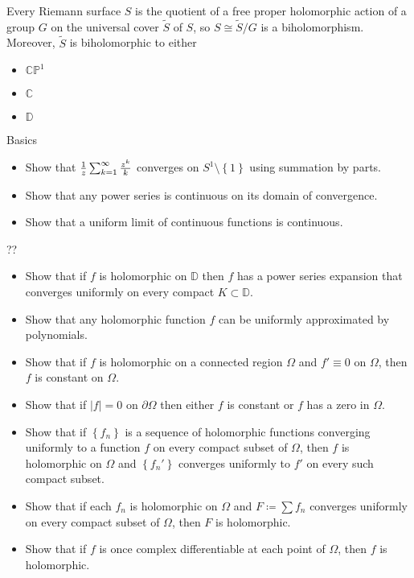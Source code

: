 \begin{theorem}[Uniformization]

Every Riemann surface \(S\) is the quotient of a free proper holomorphic
action of a group \(G\) on the universal cover \(\tilde S\) of \(S\), so
\(S\cong \tilde S/G\) is a biholomorphism. Moreover, \(\tilde S\) is
biholomorphic to either

\begin{itemize}
\tightlist
\item
  \({\mathbb{CP}}^1\)
\item
  \({\mathbb{C}}\)
\item
  \({\mathbb{D}}\)
\end{itemize}

\end{theorem}

Basics

\begin{itemize}
\tightlist
\item
  Show that \({1\over z} \sum_{k=1}^\infty {z^k \over k}\) converges on
  \(S^1 \setminus\left\{{1}\right\}\) using summation by parts.
\item
  Show that any power series is continuous on its domain of convergence.
\item
  Show that a uniform limit of continuous functions is continuous.
\end{itemize}

??

\begin{itemize}
\item
  Show that if \(f\) is holomorphic on \({\mathbb{D}}\) then \(f\) has a
  power series expansion that converges uniformly on every compact
  \(K\subset {\mathbb{D}}\).
\item
  Show that any holomorphic function \(f\) can be uniformly approximated
  by polynomials.
\item
  Show that if \(f\) is holomorphic on a connected region \(\Omega\) and
  \(f'\equiv 0\) on \(\Omega\), then \(f\) is constant on \(\Omega\).
\item
  Show that if \({\left\lvert {f} \right\rvert} = 0\) on
  \({{\partial}}\Omega\) then either \(f\) is constant or \(f\) has a
  zero in \(\Omega\).
\item
  Show that if \(\left\{{f_n}\right\}\) is a sequence of holomorphic
  functions converging uniformly to a function \(f\) on every compact
  subset of \(\Omega\), then \(f\) is holomorphic on \(\Omega\) and
  \(\left\{{f_n'}\right\}\) converges uniformly to \(f'\) on every such
  compact subset.
\item
  Show that if each \(f_n\) is holomorphic on \(\Omega\) and
  \(F \coloneqq\sum f_n\) converges uniformly on every compact subset of
  \(\Omega\), then \(F\) is holomorphic.
\item
  Show that if \(f\) is once complex differentiable at each point of
  \(\Omega\), then \(f\) is holomorphic.
\end{itemize}

